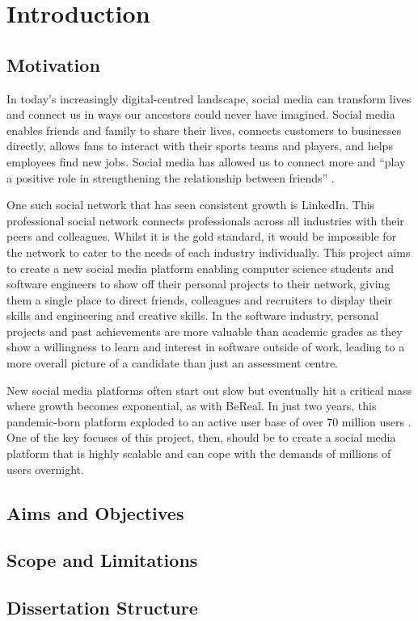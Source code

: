 \chapter{Introduction}
\label{cha:intro}

\section{Motivation}
In today's increasingly digital-centred landscape, social media can transform lives and connect us in ways our ancestors could never have imagined.
Social media enables friends and family to share their lives, connects customers to businesses directly, allows fans to interact with their sports teams and players, and helps employees find new jobs. 
Social media has allowed us to connect more and ``play a positive role in strengthening the relationship between friends'' \citep{chen2017social}. 

One such social network that has seen consistent growth is LinkedIn. This professional social network connects professionals across all industries with their peers and colleagues.
Whilst it is the gold standard, it would be impossible for the network to cater to the needs of each industry individually.
This project aims to create a new social media platform enabling computer science students and software engineers to show off their personal projects to their network, giving them a single place to direct friends, colleagues and recruiters to display their skills and engineering and creative skills. 
In the software industry, personal projects and past achievements are more valuable than academic grades as they show a willingness to learn and interest in software outside of work, leading to a more overall picture of a candidate than just an assessment centre.

New social media platforms often start out slow but eventually hit a critical mass where growth becomes exponential, as with BeReal.
In just two years, this pandemic-born platform exploded to an active user base of over 70 million users \citep{curry2025bereal}. One of the key focuses of this project, then, should be to create a social media platform that is highly scalable and can cope with the demands of millions of users overnight. 

\section{Aims and Objectives}
\label{sec:intro-aims}

\section{Scope and Limitations}
\label{sec:intro-scope}

\section{Dissertation Structure}
\label{sec:intro-structure}
